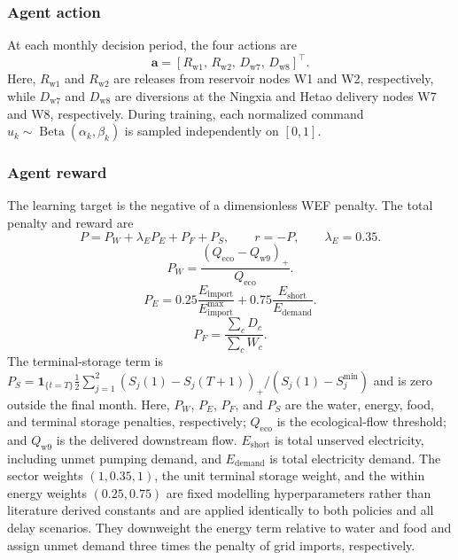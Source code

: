 \documentclass [a4paper,fleqn] {cas-dc}
\begin{document}
\subsubsection{Agent action}
\label{sec321}
At each monthly decision period, the four actions are
\begin{equation}
  \mathbf a=[R_{\mathrm{w1}},\,R_{\mathrm{w2}},\,D_{\mathrm{w7}},\,D_{\mathrm{w8}}]^{\top}.
  \label{eq:action-vector}
\end{equation}
Here, $R_{\mathrm{w1}}$ and $R_{\mathrm{w2}}$ are releases from reservoir nodes W1 and W2, respectively, while $D_{\mathrm{w7}}$ and $D_{\mathrm{w8}}$ are diversions at the Ningxia and Hetao delivery nodes W7 and W8, respectively. During training, each normalized command $u_k\sim\operatorname{Beta}(\alpha_k,\beta_k)$ is sampled independently on $[0,1]$. 


\subsubsection{Agent reward}
\label{sec322}

The learning target is the negative of a dimensionless WEF penalty. The total penalty and reward are
\begin{equation}
  P=P_W+\lambda_E P_E+P_F+P_S,
  \qquad r=-P,
  \qquad \lambda_E=0.35.
  \label{eq:wef-reward}
\end{equation}
\begin{equation}
  P_W=\frac{\left(Q_{\mathrm{eco}}-Q_{\mathrm{w9}}\right)_+}{Q_{\mathrm{eco}}}.
  \label{eq:water-penalty}
\end{equation}
\begin{equation}
  P_E=0.25\frac{E_{\mathrm{import}}}{E_{\mathrm{import}}^{\max}}
      +0.75\frac{E_{\mathrm{short}}}{E_{\mathrm{demand}}}.
  \label{eq:energy-penalty}
\end{equation}
\begin{equation}
  P_F=\frac{\sum_c D_c}{\sum_c W_c}.
  \label{eq:food-penalty}
\end{equation}
The terminal-storage term is $P_S=\mathbf{1}_{\{t=T\}}\frac{1}{2}\sum_{j=1}^{2}(S_j(1)-S_j(T+1))_+/(S_j(1)-S_j^{\min})$ and is zero outside the final month. Here, $P_W$, $P_E$, $P_F$, and $P_S$ are the water, energy, food, and terminal storage penalties, respectively; $Q_{\mathrm{eco}}$ is the ecological-flow threshold; and $Q_{\mathrm{w9}}$ is the delivered downstream flow. $E_{\mathrm{short}}$ is total unserved electricity, including unmet pumping demand, and $E_{\mathrm{demand}}$ is total electricity demand. The sector weights $(1,0.35,1)$, the unit terminal storage weight, and the within energy weights $(0.25,0.75)$ are fixed modelling hyperparameters rather than literature derived constants and are applied identically to both policies and all delay scenarios. They downweight the energy term relative to water and food and assign unmet demand three times the penalty of grid imports, respectively.
\end{document}
